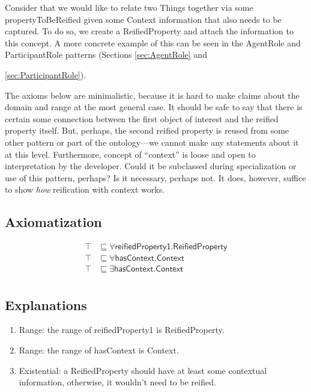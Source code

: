 Consider that we would like to relate two \textsf{Things} together via some \textsf{propertyToBeReified} given some \textsf{Context} information that also needs to be captured. To do so, we create a \textsf{ReifiedProperty} and attach the information to this concept. A more concrete example of this can be seen in the \textsf{AgentRole} and \textsf{ParticipantRole} patterns (Sections \ref{sec:AgentRole} and {\ref{sec:ParticipantRole}).

The axioms below are minimalistic, because it is hard to make claims about the domain and range at the most general case. It should be safe to say that there is certain some connection between the first object of interest and the reified property itself. But, perhaps, the second reified property is reused from some other pattern or part of the ontology---we cannot make any statements about it at this level. Furthermore, concept of ``context'' is loose and open to interpretation by the developer. Could it be subclassed during specialization or use of this pattern, perhaps? Is it necessary, perhaps not. It does, however, suffice to show \emph{how} reification with context works.
\subsection{Axiomatization}
\label{axs:Property}
\begin{align}
\top &\sqsubseteq \forall \textsf{reifiedProperty1.ReifiedProperty} \\
\top &\sqsubseteq \forall \textsf{hasContext.Context} \\
\top &\sqsubseteq \exists \textsf{hasContext.Context} \\
\end{align}

\subsection{Explanations}
\label{exp:Property}
\begin{enumerate}
\item Range: the range of \textsf{reifiedProperty1} is \textsf{ReifiedProperty}.
\item Range: the range of \textsf{hasContext} is \textsf{Context}.
\item Existential: a \textsf{ReifiedProperty} should have at least some contextual information, otherwise, it wouldn't need to be reified.


\end{enumerate}}
